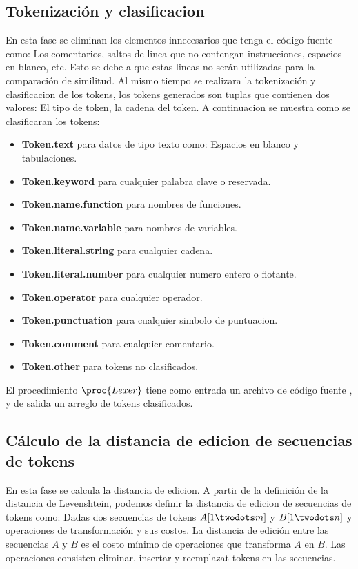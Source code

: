 \subsection{Tokenización y clasificacion}
En esta fase se eliminan los elementos innecesarios que tenga el código fuente como: Los comentarios, saltos de linea que no contengan instrucciones, espacios en blanco, etc. Esto se debe a que estas lineas no serán utilizadas para la comparación de similitud. Al mismo tiempo se realizara la tokenización y clasificacion de los tokens, los tokens generados son tuplas que contienen dos valores: El tipo de token, la cadena del token. A continuacion se muestra como se clasificaran los tokens:
\begin{itemize}
  \item \textbf{Token.text} para datos de tipo texto como: Espacios en blanco y  tabulaciones.
  \item \textbf{Token.keyword} para cualquier palabra clave o reservada.
  \item \textbf{Token.name.function} para nombres de funciones.
  \item \textbf{Token.name.variable} para nombres de variables.
  \item \textbf{Token.literal.string} para cualquier cadena.
  \item \textbf{Token.literal.number} para cualquier numero entero o flotante.
  \item \textbf{Token.operator} para cualquier operador.
  \item \textbf{Token.punctuation} para cualquier simbolo de puntuacion.
  \item \textbf{Token.comment} para cualquier comentario.
  \item \textbf{Token.other} para tokens no clasificados.
\end{itemize}



El procedimiento $\proc{Lexer}$ tiene como entrada un archivo de código fuente , y de salida un arreglo de tokens clasificados.



\subsection{Cálculo de la distancia de edicion de secuencias de tokens}
En esta fase se calcula la distancia de edicion. A partir de la definición de la distancia de Levenshtein, podemos definir la distancia de edicion de secuencias de tokens como: Dadas dos secuencias de tokens $A[1 \twodots m]$ y $B[1 \twodots n]$ y operaciones de transformación y sus costos. La distancia de edición entre las secuencias $A$ y $B$ es el costo mínimo de operaciones que transforma $A$ en $B$. Las operaciones consisten eliminar, insertar y reemplazat tokens en las secuencias.

